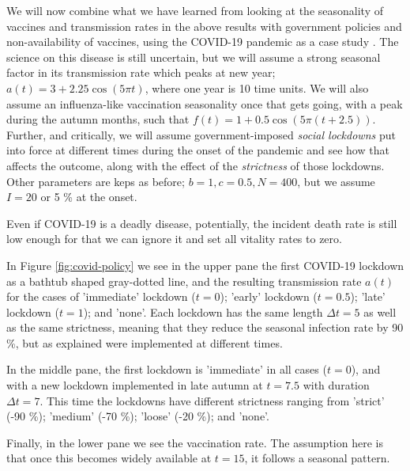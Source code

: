 \documentclass[]{article}
\begin{document}
We will now combine what we have learned from looking at the seasonality of vaccines and transmission rates in the above results with government policies and non-availability of vaccines, using the COVID-19 pandemic as a case study \cite{who-url}. The science on this disease is still uncertain, but we will assume a strong seasonal factor in its transmission rate which peaks at new year; $a(t) = 3 + 2.25 \cos (5\pi t) $, where one year is 10 time units. We will also assume an influenza-like vaccination seasonality once that gets going, with a peak during the autumn months, such that $f(t) = 1 + 0.5 \cos (5\pi (t+2.5))$. Further, and critically, we will assume government-imposed \textit{social lockdowns} put into force at different times during the onset of the pandemic and see how that affects the outcome, along with the effect of the \textit{strictness} of those lockdowns. Other parameters are keps as before; $b=1, c=0.5, N=400$, but we assume $I=20$ or 5 \% at the onset.

Even if COVID-19 is a deadly disease, potentially, the incident death rate is still low enough for that we can ignore it and set all vitality rates to zero.

In Figure \ref{fig:covid-policy} we see in the upper pane the first COVID-19 lockdown as a bathtub shaped gray-dotted line, and the resulting transmission rate $a(t)$ for the cases of 'immediate' lockdown ($t=0$); 'early' lockdown ($t=0.5$); 'late' lockdown ($t=1$); and 'none'. Each lockdown has the same length $\Delta t = 5$ as well as the same strictness, meaning that they reduce the seasonal infection rate by 90 \%, but as explained were implemented at different times. 

In the middle pane, the first lockdown is 'immediate' in all cases ($t=0$), and with a new lockdown implemented in late autumn at $t=7.5$ with duration $\Delta t = 7$. This time the lockdowns have different strictness ranging from 'strict' (-90 \%); 'medium' (-70 \%); 'loose' (-20 \%); and 'none'.

Finally, in the lower pane we see the vaccination rate. The assumption here is that once this becomes widely available at $t=15$, it follows a seasonal pattern.
\end{document}

